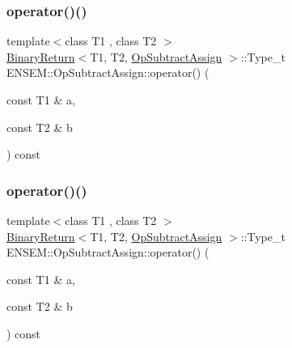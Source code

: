 \subsubsection{\texorpdfstring{operator()()}{operator()()}\hspace{0.1cm}{\footnotesize\ttfamily [1/3]}}
{\footnotesize\ttfamily template$<$class T1 , class T2 $>$ \\
\mbox{\hyperlink{structENSEM_1_1BinaryReturn}{Binary\+Return}}$<$T1, T2, \mbox{\hyperlink{structENSEM_1_1OpSubtractAssign}{Op\+Subtract\+Assign}} $>$\+::Type\+\_\+t E\+N\+S\+E\+M\+::\+Op\+Subtract\+Assign\+::operator() (\begin{DoxyParamCaption}\item[{const T1 \&}]{a,  }\item[{const T2 \&}]{b }\end{DoxyParamCaption}) const\hspace{0.3cm}{\ttfamily [inline]}}

\mbox{\label{structENSEM_1_1OpSubtractAssign_a8de7df08fa13e2efc8c47c28b8b17887}} 
\subsubsection{\texorpdfstring{operator()()}{operator()()}\hspace{0.1cm}{\footnotesize\ttfamily [2/3]}}
{\footnotesize\ttfamily template$<$class T1 , class T2 $>$ \\
\mbox{\hyperlink{structENSEM_1_1BinaryReturn}{Binary\+Return}}$<$T1, T2, \mbox{\hyperlink{structENSEM_1_1OpSubtractAssign}{Op\+Subtract\+Assign}} $>$\+::Type\+\_\+t E\+N\+S\+E\+M\+::\+Op\+Subtract\+Assign\+::operator() (\begin{DoxyParamCaption}\item[{const T1 \&}]{a,  }\item[{const T2 \&}]{b }\end{DoxyParamCaption}) const\hspace{0.3cm}{\ttfamily [inline]}}

\mbox{\label{structENSEM_1_1OpSubtractAssign_a8de7df08fa13e2efc8c47c28b8b17887}} 
